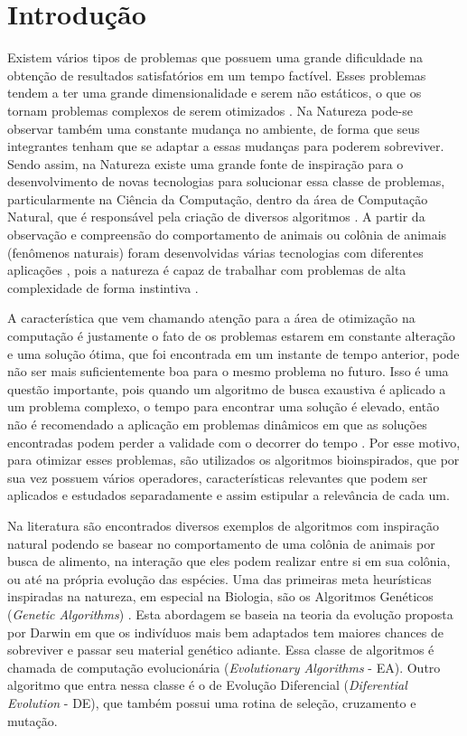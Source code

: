 \chapter{Introdução}
\label{ch:intro}

Existem vários tipos de problemas que possuem uma grande dificuldade na obtenção de resultados satisfatórios em um tempo factível. Esses problemas tendem a ter uma grande dimensionalidade e serem não estáticos, o que os tornam problemas complexos de serem otimizados \cite{de2004otimizaccao}. Na Natureza pode-se observar também uma constante mudança no ambiente, de forma que seus integrantes tenham que se adaptar a essas mudanças para poderem sobreviver. Sendo assim, na Natureza existe uma grande fonte de inspiração para o desenvolvimento de novas tecnologias para solucionar essa classe de problemas, particularmente na Ciência da Computação, dentro da área de Computação Natural, que é responsável pela criação de diversos algoritmos \cite{de2007fundamentals}. A partir da observação e compreensão do comportamento de animais ou colônia de animais (fenômenos naturais) foram desenvolvidas várias tecnologias com diferentes aplicações \cite{rozenberg2011handbook}, pois a natureza é capaz de trabalhar com problemas de alta complexidade de forma instintiva \cite{andre2015multiple}.

A característica que vem chamando atenção para a área de otimização na computação é justamente o fato de os problemas estarem em constante alteração e uma solução ótima, que foi encontrada em um instante de tempo anterior, pode não ser mais suficientemente boa para o mesmo problema no futuro. Isso é uma questão importante, pois quando um algoritmo de busca exaustiva é aplicado a um problema complexo, o tempo para encontrar uma solução é elevado, então não é recomendado a aplicação em problemas dinâmicos em que as soluções encontradas podem perder a validade com o decorrer do tempo \cite{morrison2003performance}. Por esse motivo, para otimizar esses problemas, são utilizados os algoritmos bioinspirados, que por sua vez possuem vários operadores, características relevantes que podem ser aplicados e estudados separadamente e assim estipular a relevância de cada um.

Na literatura são encontrados diversos exemplos de algoritmos com inspiração natural podendo se basear no comportamento de uma colônia de animais por busca de alimento, na interação que eles podem realizar entre si em sua colônia, ou até na própria evolução das espécies. Uma das primeiras meta heurísticas inspiradas na natureza, em especial na Biologia, são os Algoritmos Genéticos (\textit{Genetic Algorithms}) \cite{holland1975adaptation}. Esta abordagem se baseia na teoria da evolução proposta por Darwin em que os indivíduos mais bem adaptados tem maiores chances de sobreviver e passar seu material genético adiante. Essa classe de algoritmos é chamada de computação evolucionária (\textit{Evolutionary Algorithms} - EA). Outro algoritmo que entra nessa classe é o de Evolução Diferencial (\textit{Diferential Evolution} - DE), que também possui uma rotina de seleção, cruzamento e mutação.


